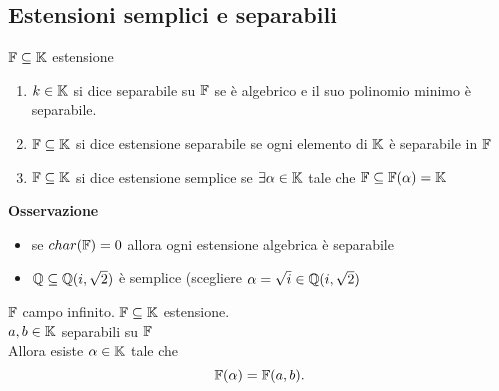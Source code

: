 \documentclass[12px]{article}
\begin{document}
\subsection{Estensioni semplici e separabili}
\begin{defi}
	$\mathbb{F}\subseteq\mathbb{K}$ estensione
	 \begin{enumerate}
		 \item $k\in\mathbb{K}$ si dice separabile su $\mathbb{F}$ se è algebrico e il suo polinomio minimo è separabile.
		 \item  $\mathbb{F}\subseteq\mathbb{K}$ si dice estensione separabile se ogni elemento di  $\mathbb{K}$ è separabile in $\mathbb{F}$
		 \item  $\mathbb{F}\subseteq\mathbb{K}$ si dice estensione semplice se  $\exists \alpha\in\mathbb{K}$ tale che $\mathbb{F}\subseteq\mathbb{F}(\alpha) = \mathbb{K}$
	\end{enumerate}
\end{defi}
\textbf{Osservazione}
\begin{itemize}
	\item se $char(\mathbb{F}) = 0$ allora ogni estensione algebrica è separabile
	\item $\mathbb{Q}\subseteq\mathbb{Q}(i,\sqrt 2)$ è semplice (scegliere $\alpha = \sqrt{i}\in\mathbb{Q}(i,\sqrt 2)$
\end{itemize}
\begin{prop}
	$\mathbb{F}$ campo infinito. $\mathbb{F}\subseteq \mathbb{K}$ estensione.\\
	 $a,b\in\mathbb{K}$ separabili su  $\mathbb{F}$\\
	 Allora esiste  $\alpha\in\mathbb{K}$ tale che
	  \[
	 \mathbb{F}(\alpha) = \mathbb{F}(a,b)
	 .\] 
\end{prop}
\end{document}
